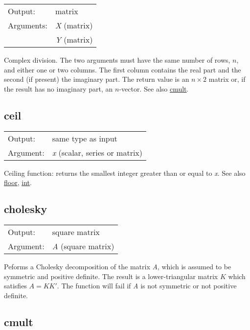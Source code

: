 \begin{tabular}{ll}
Output:     & matrix\\
Arguments:  & \textsl{X} (matrix)\\
           & \textsl{Y} (matrix)\\
\end{tabular}

	  Complex division. The two arguments must have the same number of
	  rows, \ensuremath{n}, and either one or two columns.  The first
	  column contains the real part and the second (if present) the
	  imaginary part.  The return value is an \ensuremath{n\times 2}
	  matrix or, if the result has no imaginary part, an
	  \ensuremath{n}-vector.
	  See also \hyperlink{func-cmult}{cmult}.

\subsection{ceil}
\hypertarget{func-ceil}{}

\begin{tabular}{ll}
Output:     & same type as input\\
Argument:   & \textsl{x} (scalar, series or matrix)\\
\end{tabular}

	  Ceiling function: returns the smallest integer greater than or
	  equal to \textsl{x}. 
	  See also \hyperlink{func-floor}{floor}, \hyperlink{func-int}{int}.

\subsection{cholesky}
\hypertarget{func-cholesky}{}

\begin{tabular}{ll}
Output:     & square matrix\\
Argument:   & \textsl{A} (square matrix)\\
\end{tabular}

	  Peforms a Cholesky decomposition of the matrix
	  \textsl{A}, which is assumed to be symmetric and
	  positive definite. The result is a lower-triangular matrix
	  \ensuremath{K} which satisfies $A = KK'$. The function will fail if
	  \textsl{A} is not symmetric or not positive definite.

\subsection{cmult}
\hypertarget{func-cmult}{}

